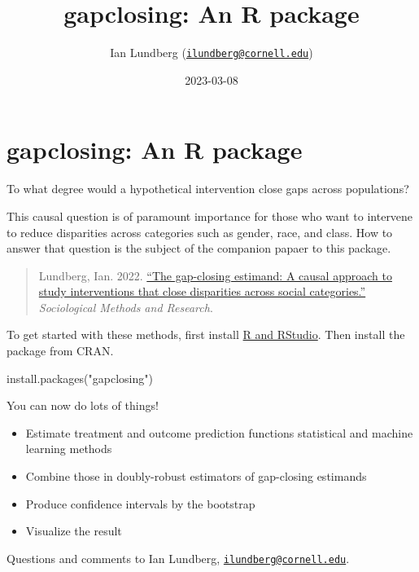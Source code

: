 \documentclass[
]{article}
\title{gapclosing: An R package}
\author{Ian Lundberg (\href{mailto:ilundberg@cornell.edu}{\nolinkurl{ilundberg@cornell.edu}})}
\date{2023-03-08}
\newenvironment{Shaded}{\begin{snugshade}}{\end{snugshade}}
\newcommand{\FunctionTok}[1]{\textcolor[rgb]{0.00,0.00,0.00}{#1}}
\newcommand{\NormalTok}[1]{#1}
\newcommand{\StringTok}[1]{\textcolor[rgb]{0.31,0.60,0.02}{#1}}
\providecommand{\tightlist}{%
  \setlength{\itemsep}{0pt}\setlength{\parskip}{0pt}}
\begin{document}
\maketitle

{
\setcounter{tocdepth}{2}
\tableofcontents
}
\hypertarget{gapclosing-an-r-package}{%
\section{gapclosing: An R package}\label{gapclosing-an-r-package}}

To what degree would a hypothetical intervention close gaps across populations?

This causal question is of paramount importance for those who want to intervene to reduce disparities across categories such as gender, race, and class. How to answer that question is the subject of the companion papaer to this package.

\begin{quote}
Lundberg, Ian. 2022. \href{https://doi.org/10.1177/00491241211055769}{``The gap-closing estimand: A causal approach to study interventions that close disparities across social categories.''} \emph{Sociological Methods and Research}.
\end{quote}

To get started with these methods, first install \href{https://rstudio-education.github.io/hopr/starting.html}{R and RStudio}. Then install the package from CRAN.

\begin{Shaded}
\begin{Highlighting}[]
\FunctionTok{install.packages}\NormalTok{(}\StringTok{"gapclosing"}\NormalTok{)}
\end{Highlighting}
\end{Shaded}

You can now do lots of things!

\begin{itemize}
\tightlist
\item
  Estimate treatment and outcome prediction functions statistical and machine learning methods
\item
  Combine those in doubly-robust estimators of gap-closing estimands
\item
  Produce confidence intervals by the bootstrap
\item
  Visualize the result
\end{itemize}

Questions and comments to Ian Lundberg, \href{mailto:ilundberg@cornell.edu}{\nolinkurl{ilundberg@cornell.edu}}.
\end{document}
